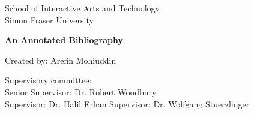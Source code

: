 \documentclass[12pt]{article}
\begin{document}
\begin{center}

        School of Interactive Arts and Technology\\
        Simon Fraser University
        
        \bigskip
        \bigskip
        \bigskip
        \bigskip
        
        {\Large\textbf{An Annotated Bibliography}}
        \medskip

        {\large   Created by: Arefin Mohiuddin
%       
%       
        }
        
        \bigskip
        \bigskip
        \bigskip
        \bigskip
        
        Supervisory committee:\\
        Senior Supervisor: Dr. Robert Woodbury\\
        Supervisor: Dr. Halil Erhan
        Supervisor: Dr. Wolfgang Stuerzlinger
\end{center}


\newpage
\tableofcontents


% 
% 
% 

\newpage



\newpage



\newpage

                

\newpage




\clearpage
\newpage
\newpage
\printbibliography %

% 

% 
%
%
%
\end{document}
